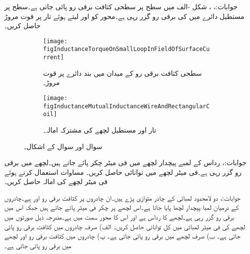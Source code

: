 جوابات:، ، 
شکل -الف میں  سطح پر سطحی کثافت برقی رو  پائی جاتی ہے۔سطح  پر مستطیل دائرے میں  کی برقی رو گزر رہی ہے۔محور کو  اور  لیتے ہوئے تار پر قوت مروڑ حاصل کریں۔
\begin{figure}
\centering
\begin{subfigure}{0.5\textwidth}
\centering
\texttt{[image: figInductanceTorqueOnSmallLoopInFieldOfSurfaceCurrent]}
\caption{سطحی کثافت برقی رو کے میدان میں بند دائرے پر قوت مروڑ۔}
\end{subfigure}%
%
\begin{subfigure}{0.5\textwidth}
\centering
\texttt{[image: figInductanceMutualInductanceWireAndRectangularCoil]}
\caption{تار اور مستطیل لچھے کی مشترکہ امالہ۔}
\end{subfigure}%
\caption{سوال  اور سوال  کے اشکال۔}
\label{شکل_امالہ_سوالات_سطحی_میدان_اور_دائرہ}
\end{figure}

جوابات:، 
رداس  کے لمبے پیچدار لچھے میں فی میٹر  چکر پائے جاتے ہیں۔لچھے میں  برقی رو گزر رہی ہے۔فی میٹر لچھے میں توانائی  حاصل کریں۔ مساوات  استعمال کرتے ہوئے فی میٹر لچھے کی امالہ حاصل کریں۔

جوابات:، 
دو لامحدود لمبائی کے چادر متوازی پڑے ہیں۔ان چادروں پر کثافت برقی رو  اور 
 ہے۔چادروں کے درمیان لمبا پیچدار لچھا پایا جاتا ہے۔اس لچھے پر  چکر فی میٹر پائے جاتے ہیں جبکہ اس میں  برقی رو گزر رہی ہے۔لچھے کا رداس  ہے اور اس کا محور  سمت میں ہے۔مندرجہ ذیل صورتوں میں لچھے کی فی میٹر لمبائی میں کل توانائی حاصل کریں۔ الف) صرف چادروں میں کثافت برقی رو پائی جاتی ہے۔ ب) صرف لچھے میں برقی رو پائی جاتی ہے۔ پ) چادروں میں کثافت برقی رو اور لچھے میں برقی رو پائی جاتی ہے۔

